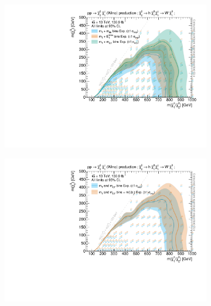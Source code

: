 \begin{figure}
	\centering
	\begin{subfigure}[b]{0.5\linewidth}
		\centering\includegraphics[width=1.0\textwidth]{HF/plot_binnings_cls}
		\caption{\label{fig:plot_binnings_cls}}
	\end{subfigure}\hfill
	\begin{subfigure}[b]{0.5\linewidth}
		\centering\includegraphics[width=1.0\textwidth]{HF/plot_mlb1_cls}
		\caption{\label{fig:plot_mlb1_cls}}
	\end{subfigure}\hfill
	\par\bigskip
	\begin{subfigure}[b]{0.5\linewidth}

\end{subfigure}
\end{figure}
